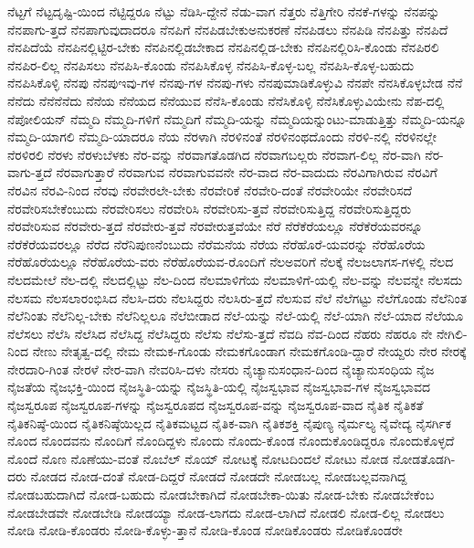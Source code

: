 {ನೆಟ್ಟಗೆ
ನೆಟ್ಟದೃಷ್ಟಿ-ಯಿಂದ
ನೆಟ್ಟಿದ್ದರೂ
ನೆಟ್ಟು
ನೆಡಿಸಿ-ದ್ದೇನೆ
ನೆಡು-ವಾಗ
ನೆತ್ತರು
ನೆತ್ತಿಗೇರಿ
ನೆನಕೆ-ಗಳನ್ನು
ನೆನಪನ್ನು
ನೆನಪಾಗು-ತ್ತದೆ
ನೆನಪಾಗುವುದಾದರೂ
ನೆನಪಿಗೆ
ನೆನಪಿಡಬೇಕುಅನುಕರಣೆ
ನೆನಪಿಡಲು
ನೆನಪಿಡಿ
ನೆನಪಿತ್ತು
ನೆನಪಿದೆ
ನೆನಪಿದೆಯೆ
ನೆನಪಿನಲ್ಲಿಟ್ಟಿರ-ಬೇಕು
ನೆನಪಿನಲ್ಲಿಡಬೇಕಾದ
ನೆನಪಿನಲ್ಲಿಡ-ಬೇಕು
ನೆನಪಿನಲ್ಲಿರಿಸಿ-ಕೊಂಡು
ನೆನಪಿರಲಿ
ನೆನಪಿರ-ಲಿಲ್ಲ
ನೆನಪಿಸಲು
ನೆನಪಿಸಿ-ಕೊಂಡು
ನೆನಪಿಸಿಕೊಳ್ಳ
ನೆನಪಿಸಿ-ಕೊಳ್ಳ-ಬಲ್ಲ
ನೆನಪಿಸಿ-ಕೊಳ್ಳ-ಬಹುದು
ನೆನಪಿಸಿಕೊಳ್ಳಿ
ನೆನಪು
ನೆನಪುಇವು-ಗಳ
ನೆನಪು-ಗಳ
ನೆನಪು-ಗಳು
ನೆನಪುಮಾಡಿಕೊಳ್ಳುವಿ
ನೆನಪೇ
ನೆನಸಿಕೊಳ್ಳಬೇಡ
ನೆನೆ
ನೆನೆದು
ನೆನೆನೆನೆದು
ನೆನೆಯ
ನೆನೆಯದ
ನೆನೆಯುವ
ನೆನೆಸಿ-ಕೊಂಡು
ನೆನೆಸಿಕೊಳ್ಳಿ
ನೆನೆಸಿಕೊಳ್ಳುವಿಯೇನು
ನೆಪ-ದಲ್ಲಿ
ನೆಪೋಲಿಯನ್
ನೆಮ್ಮದಿ
ನೆಮ್ಮದಿ-ಗಳಿಗೆ
ನೆಮ್ಮದಿಗೆ
ನೆಮ್ಮದಿ-ಯನ್ನು
ನೆಮ್ಮದಿಯನ್ನುಂಟು-ಮಾಡುತ್ತಿತ್ತು
ನೆಮ್ಮದಿ-ಯನ್ನೂ
ನೆಮ್ಮದಿ-ಯಾಗಲಿ
ನೆಮ್ಮದಿ-ಯಾದರೂ
ನೆಯ
ನೆರಳಾಗಿ
ನೆರಳಿನಂತೆ
ನೆರಳಿನಂಥದೊಂದು
ನೆರಳಿ-ನಲ್ಲಿ
ನೆರಳಿನಲ್ಲೇ
ನೆರಳಿರಲಿ
ನೆರಳು
ನೆರಳುಬೆಳಕು
ನೆರ-ವನ್ನು
ನೆರವಾಗತೊಡಗಿದ
ನೆರವಾಗಬಲ್ಲರು
ನೆರವಾಗ-ಲಿಲ್ಲ
ನೆರ-ವಾಗಿ
ನೆರ-ವಾಗು-ತ್ತದೆ
ನೆರವಾಗುತ್ತಾರೆ
ನೆರವಾಗುವ
ನೆರವಾಗುವವನೇ
ನೆರ-ವಾದ
ನೆರ-ವಾದುದು
ನೆರವಿಗಾಗಿರುವ
ನೆರವಿಗೆ
ನೆರವಿನ
ನೆರವಿ-ನಿಂದ
ನೆರವು
ನೆರವೇರಲೇ-ಬೇಕು
ನೆರವೇರಿಕೆ
ನೆರವೇರಿ-ದಂತೆ
ನೆರವೇರಿಯೇ
ನೆರವೇರಿಸದೆ
ನೆರವೇರಿಸಬೇಕೆಂಬುದು
ನೆರವೇರಿಸಲು
ನೆರವೇರಿಸಿ
ನೆರವೇರಿಸು-ತ್ತವೆ
ನೆರವೇರಿಸುತ್ತಿದ್ದ
ನೆರವೇರಿಸುತ್ತಿದ್ದರು
ನೆರವೇರಿಸುವ
ನೆರವೇರು-ತ್ತದೆ
ನೆರವೇರು-ತ್ತವೆ
ನೆರವೇರುತ್ತವೆಯೇ
ನೆರೆ
ನೆರೆಕೆರೆಯಲ್ಲೂ
ನೆರೆಕೆರೆಯವರನ್ನೂ
ನೆರೆಕೆರೆಯವರಲ್ಲೂ
ನೆರೆದ
ನೆರೆನಿಪುಣನೆಂಬುದು
ನೆರೆಮನೆಯ
ನೆರೆಯ
ನೆರೆಹೊರೆ-ಯವರನ್ನು
ನೆರೆಹೊರೆಯ
ನೆರೆಹೊರೆಯಲ್ಲೂ
ನೆರೆಹೊರೆಯ-ವರು
ನೆರೆಹೊರೆಯವ-ರೊಂದಿಗೆ
ನೆಲಅವರಿಗೆ
ನೆಲಕ್ಕೆ
ನೆಲಜಲಾಗಸ-ಗಳಲ್ಲಿ
ನೆಲದ
ನೆಲದಮೇಲೆ
ನೆಲ-ದಲ್ಲಿ
ನೆಲದಲ್ಲಿಟ್ಟು
ನೆಲ-ದಿಂದ
ನೆಲಮಾಳಿಗೆಯ
ನೆಲಮಾಳಿಗೆ-ಯಲ್ಲಿ
ನೆಲ-ವನ್ನು
ನೆಲವನ್ನೇ
ನೆಲಸದು
ನೆಲಸಮ
ನೆಲಸಲಾರಂಭಿಸಿದ
ನೆಲಸಿ-ದರು
ನೆಲಸಿದ್ದರು
ನೆಲಸಿರು-ತ್ತದೆ
ನೆಲಸುವ
ನೆಲೆ
ನೆಲೆಗಟ್ಟು
ನೆಲೆಗೊಂಡು
ನೆಲೆನಿಂತ
ನೆಲೆನಿಂತು
ನೆಲೆನಿಲ್ಲ-ಬೇಕು
ನೆಲೆನಿಲ್ಲಲೂ
ನೆಲೆಬೀಡಾದ
ನೆಲೆ-ಯನ್ನು
ನೆಲೆ-ಯಲ್ಲಿ
ನೆಲೆ-ಯಾಗಿ
ನೆಲೆ-ಯಾದ
ನೆಲೆಯೂ
ನೆಲೆಸಲು
ನೆಲೆಸಿ
ನೆಲೆಸಿದ
ನೆಲೆಸಿದ್ದ
ನೆಲೆಸಿದ್ದರು
ನೆಲೆಸು
ನೆಲೆಸು-ತ್ತದೆ
ನೆವದಿ
ನೆವ-ದಿಂದ
ನೆಹರು
ನೆಹರೂ
ನೇ
ನೇಗಿಲಿ-ನಿಂದ
ನೇಣು
ನೇತೃತ್ವ-ದಲ್ಲಿ
ನೇಮ
ನೇಮಕ-ಗೊಂಡು
ನೇಮಕಗೊಂಡಾಗ
ನೇಮಕಗೊಂಡಿ-ದ್ದಾರೆ
ನೇಯ್ದರು
ನೇರ
ನೇರಕ್ಕೆ
ನೇರದಾರಿ-ಗಿಂತ
ನೇರಳೆ
ನೇರ-ವಾಗಿ
ನೇವರಿಸಿ-ದಳು
ನೇಸರು
ನೈಚ್ಯಾನುಸಂಧಾನ-ದಿಂದ
ನೈಚ್ಯಾನುಸಂಧಿಯ
ನೈಜ
ನೈಜತೆಯ
ನೈಜಭಕ್ತಿ-ಯಿಂದ
ನೈಜಸ್ಥಿತಿ-ಯನ್ನು
ನೈಜಸ್ಥಿತಿ-ಯಲ್ಲಿ
ನೈಜಸ್ವಭಾವ
ನೈಜಸ್ವಭಾವ-ಗಳ
ನೈಜಸ್ವಭಾವದ
ನೈಜಸ್ವರೂಪ
ನೈಜಸ್ವರೂಪ-ಗಳನ್ನು
ನೈಜಸ್ವರೂಪದ
ನೈಜಸ್ವರೂಪ-ವನ್ನು
ನೈಜಸ್ವರೂಪ-ವಾದ
ನೈತಿಕ
ನೈತಿಕತೆ
ನೈತಿಕನಿಷ್ಠೆ-ಯಿಂದ
ನೈತಿಕನಿಷ್ಠೆಯಿಲ್ಲದ
ನೈತಿಕಮಟ್ಟದ
ನೈತಿಕ-ವಾಗಿ
ನೈತಿಕಶಕ್ತಿ
ನೈಪುಣ್ಯ
ನೈರ್ಮಲ್ಯ
ನೈವೇದ್ಯ
ನೈಸರ್ಗಿಕ
ನೊಂದ
ನೊಂದವನು
ನೊಂದಿಗೆ
ನೊಂದಿದ್ದಳು
ನೊಂದು
ನೊಂದು-ಕೊಂಡ
ನೊಂದುಕೊಂಡಿದ್ದರೂ
ನೊಂದುಕೊಳ್ಳದೆ
ನೊಂದೆ
ನೊಣ
ನೊಣೆಯು-ವಂತೆ
ನೊಬೆಲ್
ನೊಯ್
ನೋಟಕ್ಕೆ
ನೋಟದಿಂದಲೆ
ನೋಟು
ನೋಡ
ನೋಡತೊಡಗಿ-ದರು
ನೋಡದ
ನೋಡ-ದಂತೆ
ನೋಡ-ದಿದ್ದರೆ
ನೋಡದೆ
ನೋಡದೇ
ನೋಡಬಲ್ಲ
ನೋಡಬಲ್ಲವನಾಗಿದ್ದ
ನೋಡಬಹುದಾಗಿದೆ
ನೋಡ-ಬಹುದು
ನೋಡಬೇಕಾಗಿದೆ
ನೋಡಬೇಕಾ-ಯಿತು
ನೋಡ-ಬೇಕು
ನೋಡಬೇಕೆಂಬ
ನೋಡಬೇಡವೇ
ನೋಡಬೇಡಿ
ನೋಡಯ್ಯಾ
ನೋಡ-ಲಾಗದು
ನೋಡ-ಲಾಗಿದೆ
ನೋಡಲಿ
ನೋಡ-ಲಿಲ್ಲ
ನೋಡಲು
ನೋಡಿ
ನೋಡಿ-ಕೊಂಡರು
ನೋಡಿ-ಕೊಳ್ಳು-ತ್ತಾನೆ
ನೋಡಿ-ಕೊಂಡ
ನೋಡಿಕೊಂಡರು
ನೋಡಿಕೊಂಡರೇ
}

